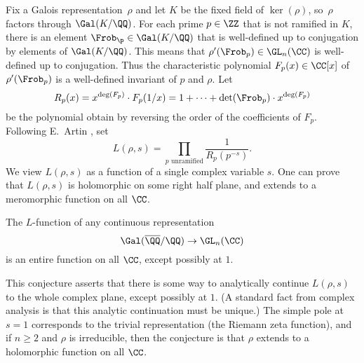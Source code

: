 {Fix a Galois representation~$\rho$ and let $K$ be the fixed field of
$\ker(\rho)$, so~$\rho$ factors through $\Gal(K/\QQ)$.  For each prime
$p \in \ZZ$ that is not ramified in $K$, there is an element
$\Frob_\p\in\Gal(K/\QQ)$ that is well-defined up to conjugation by
elements of $\Gal(K/\QQ)$.  This means that $\rho'(\Frob_p)\in
  \GL_n(\CC)$ is well-defined up to conjugation.  Thus the characteristic
polynomial $F_p(x) \in \CC[x]$ of $\rho'(\Frob_p)$ is a well-defined
invariant of $p$ and $\rho$.  Let
\[
  R_p(x)
  = x^{\deg(F_p)}\cdot F_p(1/x)
  = 1 + \cdots + \det(\Frob_p)\cdot x^{\deg(F_p)}
\]
be the polynomial obtain
by reversing the order of the coefficients of $F_p$.
Following E.~Artin \cite{artin:conjecture, artin:conjecture2}, set
\begin{equation}\label{eqn:artin}
  L(\rho,s) = \prod_{p\text{ unramified}}\frac{1}{R_p(p^{-s})}.
\end{equation}
We view $L(\rho,s)$ as a function of a single complex variable $s$.
One can prove that $L(\rho,s)$ is holomorphic on some right
half plane, and extends to a meromorphic function on all $\CC$.
\begin{conjecture}[Artin]\label{conj:artin}
  The $L$-function of any continuous representation
  \[
    \Gal(\overline{\QQ}/\QQ) \to \GL_n(\CC)
  \]
  is an entire function on all $\CC$, except possibly at $1$.
\end{conjecture}
This conjecture asserts that there is some way to analytically continue
$L(\rho,s)$ to the whole complex plane, except possibly at $1$.
(A standard fact from complex analysis is that this analytic
continuation must be unique.)
The simple pole at $s=1$ corresponds to the trivial representation (the
Riemann zeta function), and if $n\geq 2$ and $\rho$ is irreducible,
then the conjecture is that $\rho$ extends to a holomorphic function
on all $\CC$.

}
